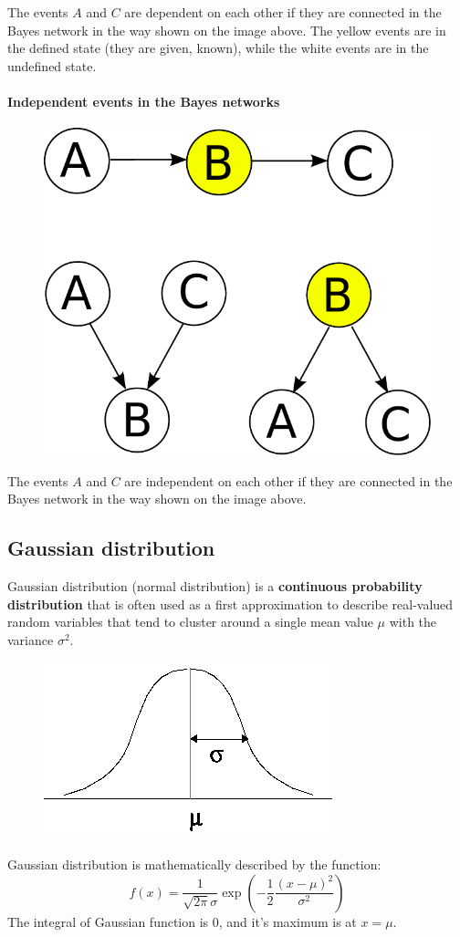 \documentclass[a4paper,10pt]{article}
\begin{document}
The events $A$ and $C$ are dependent on each other if they are connected in the Bayes network in the way shown on the image above. The yellow events are in the defined state (they are given, known), while the white events are in the undefined state.


\paragraph*{Independent events in the Bayes networks}

\begin{figure}[h!]
\centering
\includegraphics[height=0.3\textwidth]{InactiveTriplet.pdf}
\end{figure}

The events $A$ and $C$ are independent on each other if they are connected in the Bayes network in the way shown on the image above.

\subsection{Gaussian distribution}

Gaussian distribution (normal distribution) is a \textbf{continuous probability distribution} that is often used as a first approximation to describe real-valued random variables that tend to cluster around a single mean value $\mu$ with the variance $\sigma^2$.

\begin{figure}[h!]
\centering
\includegraphics[height=0.25\textwidth]{Gaussian.png}
\end{figure}
Gaussian distribution is mathematically described by the function:
\[ f(x) = \frac{1}{\sqrt{2 \pi }\sigma} \exp \left(- \frac{1}{2} \frac{(x-\mu)^2}{\sigma^2} \right) \]
The integral of Gaussian function is 0, and it's maximum is at $x=\mu$.
\end{document}
